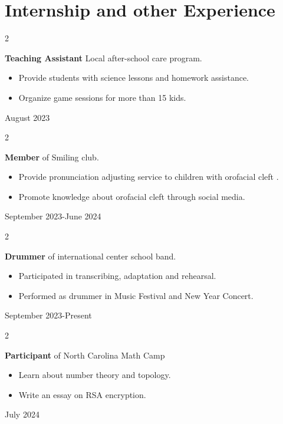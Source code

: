\documentclass[10pt, letterpaper]{article}
\newenvironment{highlights}{
    \begin{itemize}[
        topsep=0.10 cm,
        parsep=0.10 cm,
        partopsep=0pt,
        itemsep=0pt,
        leftmargin=0.4 cm + 10pt
    ]
}{
    \end{itemize}
} %
\newenvironment{twocolentry}[2][]{
    \onecolentry
    \def\secondColumn{#2}
    \setcolumnwidth{\fill, 4.5 cm}
    \begin{paracol}{2}
}{
    \switchcolumn \raggedleft \secondColumn
    \end{paracol}
    \endonecolentry
} %
\begin{document}
    \section{Internship and other Experience}    
        \begin{twocolentry}{ August 2023 }
            \textbf{Teaching Assistant} Local after-school care program.

            \begin{highlights}
                \item Provide students with science lessons and homework assistance.
                \item Organize game sessions for more than 15 kids.
            \end{highlights}
        \end{twocolentry}

        \begin{twocolentry}{ September 2023-June 2024}
            \textbf{Member} of Smiling club.

            \begin{highlights}
                \item Provide pronunciation adjusting service to children with orofacial cleft .
                \item Promote knowledge about orofacial cleft through social media.
            \end{highlights}
        \end{twocolentry}

        \begin{twocolentry}{ September 2023-Present}
            \textbf{Drummer} of international center school band.

            \begin{highlights}
                \item Participated in transcribing, adaptation and rehearsal.
                \item Performed as drummer in Music Festival and New Year Concert.
            \end{highlights}
        \end{twocolentry}

        \begin{twocolentry}{ July 2024 }
            \textbf{Participant} of North Carolina Math Camp

            \begin{highlights}
                \item Learn about number theory and topology.
                \item Write an essay on RSA encryption.
            \end{highlights}
        \end{twocolentry}
\end{document}
